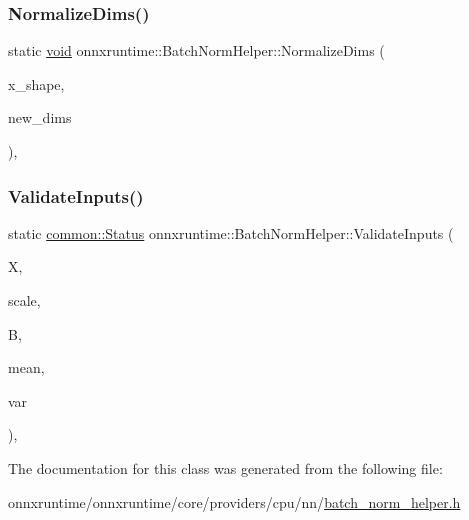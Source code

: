 \subsubsection{\texorpdfstring{Normalize\+Dims()}{NormalizeDims()}}
{\footnotesize\ttfamily static \mbox{\hyperlink{mlasi_8h_a88f941d423cb2a819b70a1358982b1a6}{void}} onnxruntime\+::\+Batch\+Norm\+Helper\+::\+Normalize\+Dims (\begin{DoxyParamCaption}\item[{const \mbox{\hyperlink{classonnxruntime_1_1TensorShape}{Tensor\+Shape}} \&}]{x\+\_\+shape,  }\item[{std\+::vector$<$ int64\+\_\+t $>$ \&}]{new\+\_\+dims }\end{DoxyParamCaption})\hspace{0.3cm}{\ttfamily [inline]}, {\ttfamily [static]}}

\mbox{\label{classonnxruntime_1_1BatchNormHelper_a21bb103bcaf585134f58764ae1bad7dd}} 
\subsubsection{\texorpdfstring{Validate\+Inputs()}{ValidateInputs()}}
{\footnotesize\ttfamily static \mbox{\hyperlink{classonnxruntime_1_1common_1_1Status}{common\+::\+Status}} onnxruntime\+::\+Batch\+Norm\+Helper\+::\+Validate\+Inputs (\begin{DoxyParamCaption}\item[{const \mbox{\hyperlink{classonnxruntime_1_1Tensor}{Tensor}} $\ast$}]{X,  }\item[{const \mbox{\hyperlink{classonnxruntime_1_1Tensor}{Tensor}} $\ast$}]{scale,  }\item[{const \mbox{\hyperlink{classonnxruntime_1_1Tensor}{Tensor}} $\ast$}]{B,  }\item[{const \mbox{\hyperlink{classonnxruntime_1_1Tensor}{Tensor}} $\ast$}]{mean,  }\item[{const \mbox{\hyperlink{classonnxruntime_1_1Tensor}{Tensor}} $\ast$}]{var }\end{DoxyParamCaption})\hspace{0.3cm}{\ttfamily [inline]}, {\ttfamily [static]}}



The documentation for this class was generated from the following file\+:\begin{DoxyCompactItemize}
\item 
onnxruntime/onnxruntime/core/providers/cpu/nn/\mbox{\hyperlink{batch__norm__helper_8h}{batch\+\_\+norm\+\_\+helper.\+h}}\end{DoxyCompactItemize}
